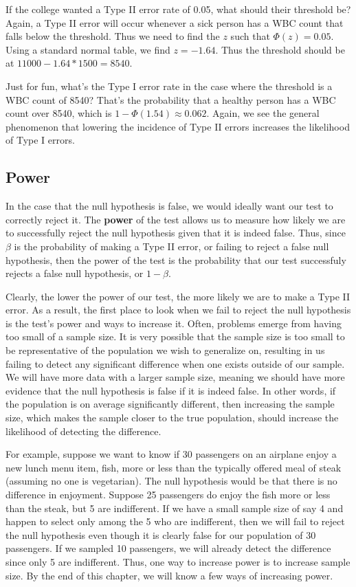 If the college wanted a Type II error rate of 0.05, what should their threshold be?  Again, a Type II error will occur whenever a sick person has a WBC count that falls below the threshold.  Thus we need to find the $z$ such that $\Phi(z)=0.05$.  Using a standard normal table, we find $z = -1.64$.  Thus the threshold should be at $11000 - 1.64*1500 = 8540$.

Just for fun, what's the Type I error rate in the case where the threshold is a WBC count of 8540?  That's the probability that a healthy person has a WBC count over 8540, which is $1-\Phi(1.54)\approx 0.062$.  Again, we see the general phenomenon that lowering the incidence of Type II errors increases the likelihood of Type I errors.

\subsection{Power} \label{sec:Power}

In the case that the null hypothesis is false, we would ideally want our test to correctly reject it. The \textbf{power} of the test allows us to measure how likely we are to successfully reject the null hypothesis given that it is indeed false. Thus, since $\beta$ is the probability of making a Type II error, or failing to reject a false null hypothesis, then the power of the test is the probability that our test successfuly rejects a false null hypothesis, or $1 - \beta$.

Clearly, the lower the power of our test, the more likely we are to make a Type II error. As a result, the first place to look when we fail to reject the null hypothesis is the test's power and ways to increase it. Often, problems emerge from having too small of a sample size. It is very possible that the sample size is too small to be representative of the population we wish to generalize on, resulting in us failing to detect any significant difference when one exists outside of our sample. We will have more data with a larger sample size, meaning we should have more evidence that the null hypothesis is false if it is indeed false. In other words, if the population is on average significantly different, then increasing the sample size, which makes the sample closer to the true population, should increase the likelihood of detecting the difference. 

For example, suppose we want to know if 30 passengers on an airplane enjoy a new lunch menu item, fish, more or less than the typically offered meal of steak (assuming no one is vegetarian). The null hypothesis would be that there is no difference in enjoyment. Suppose 25 passengers do enjoy the fish more or less than the steak, but 5 are indifferent. If we have a small sample size of say 4 and happen to select only among the 5 who are indifferent, then we will fail to reject the null hypothesis even though it is clearly false for our population of 30 passengers. If we sampled 10 passengers, we will already detect the difference since only 5 are indifferent. Thus, one way to increase power is to increase sample size. By the end of this chapter, we will know a few ways of increasing power.

